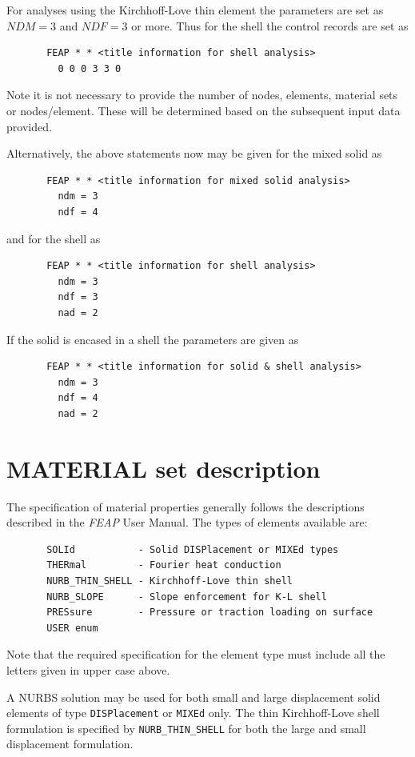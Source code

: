 For analyses using the Kirchhoff-Love thin element the parameters are
set as $NDM = 3$ and $NDF = 3$ or more.
Thus for the shell the control records are set as
\begin{verbatim}
       FEAP * * <title information for shell analysis>
         0 0 0 3 3 0
\end{verbatim}
Note it is not necessary to provide the number of nodes, elements, material sets
or nodes/element.  These will be determined based on the subsequent input
data provided.

Alternatively, the above statements now may be given for the mixed
solid as
\begin{verbatim}
       FEAP * * <title information for mixed solid analysis>
         ndm = 3 
         ndf = 4
\end{verbatim}
and for the shell as
\begin{verbatim}
       FEAP * * <title information for shell analysis>
         ndm = 3 
         ndf = 3
         nad = 2
\end{verbatim}
If the solid is encased in a shell the parameters are given as
\begin{verbatim}
       FEAP * * <title information for solid & shell analysis>
         ndm = 3 
         ndf = 4
         nad = 2
\end{verbatim}

\section{MATERIAL set description}
\label{nmaterial}

The specification of material properties generally follows the
descriptions described in the \textsl{FEAP} User Manual.
The types of elements available are:
\begin{verbatim}
       SOLId           - Solid DISPlacement or MIXEd types
       THERmal         - Fourier heat conduction 
       NURB_THIN_SHELL - Kirchhoff-Love thin shell
       NURB_SLOPE      - Slope enforcement for K-L shell
       PRESsure        - Pressure or traction loading on surface
       USER enum
\end{verbatim}
Note that the required specification for the element type must include
all the letters given in upper case above.

A NURBS solution may be
used for both small and large displacement solid elements of type
\texttt{DISPlacement} or \texttt{MIXEd} only.  The thin
Kirchhoff-Love shell formulation 
is specified by \texttt{NURB\_THIN\_SHELL} for both the large and small displacement
formulation.

